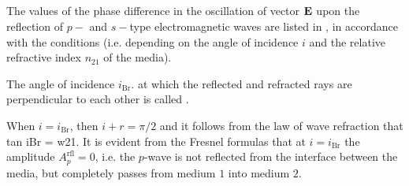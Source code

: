 


\subsection{}\label{31.5.5} The values of the phase difference in the oscillation of vector $\vb{E}$ upon the reflection of $p-$ and $s-$type electromagnetic waves are listed in , in accordance with the conditions (i.e. depending on the angle of incidence $i$ and the relative refractive index $n_{21}$ of the media).

The angle of incidence $i_{\text{Br}}$. at which the reflected and refracted rays are perpendicular to each other is called .

When $i = i_{\text{Br}}$, then $i + r = \pi/2$ and it follows from the law  of wave refraction  that tan iBr = w21. It is evident from the Fresnel formulas  that at $i = i_{\text{Br}}$ the amplitude $A_{p}^{\text{rfl}} = 0$, i.e. the $p$-wave is not reflected from the interface between the media, but completely passes from medium $\mathit{1}$ into medium $\mathit{2}$.

